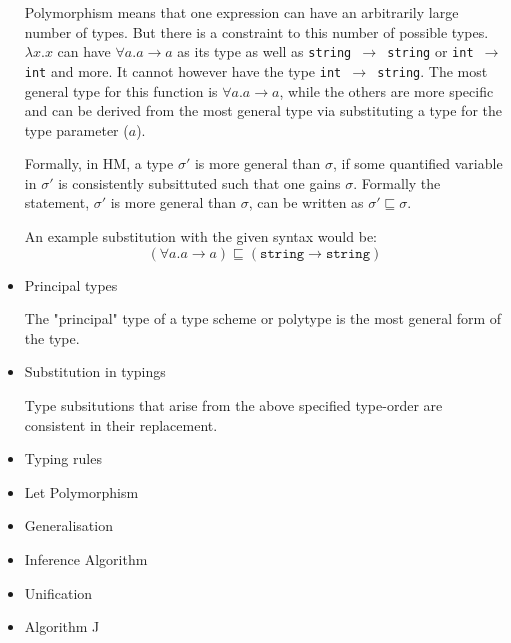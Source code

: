 \documentclass{l4proj}
\begin{document}
\begin{itemize}
    Polymorphism means that one expression can have an arbitrarily large number of types.
    But there is a constraint to this number of possible types.
    $\lambda x . x$ can have $\forall a . a \rightarrow a$ as its type as well as \texttt{string $\rightarrow$ string} or \texttt{int $\rightarrow$ int} and more.
    It cannot however have the type \texttt{int $\rightarrow$ string}.
    The most general type for this function is $\forall a . a \rightarrow a$, while the others are more specific and can be derived from the most general type via substituting a type for the type parameter ($a$).

    Formally, in HM, a type $\sigma ' $ is more general than $\sigma$, if some quantified variable in $\sigma'$ is consistently subsittuted such that one gains $\sigma$.
    Formally the statement, $\sigma ' $ is more general than $\sigma$, can be written as $\sigma' \sqsubseteq \sigma$.

    An example substitution with the given syntax would be:
    \[(\forall a . a \rightarrow a) \sqsubseteq (\texttt{string} \rightarrow \texttt{string})\]
    \item Principal types
    
    The "principal" type of a type scheme or polytype is the most general form of the type.
    \item Substitution in typings
    
    Type subsitutions that arise from the above specified type-order are consistent in their replacement.
    \item Typing rules
    \item Let Polymorphism
    \item Generalisation
    \item Inference Algorithm
    \item Unification 
    \item Algorithm J
    
\end{itemize}



\end{document}
